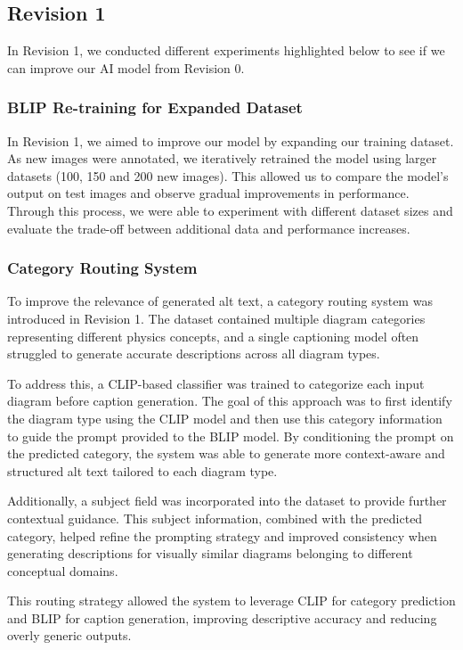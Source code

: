 \documentclass[11pt]{article}
\begin{document}
\subsection{Revision 1}
In Revision 1, we conducted different experiments highlighted below to see if we can improve our 
AI model from Revision 0.

\subsubsection{BLIP Re-training for Expanded Dataset} 
In Revision 1, we aimed to improve our model by expanding our training dataset. 
As new images were annotated, we iteratively retrained the model using larger datasets
(100, 150 and 200 new images). This allowed us to compare the model's output on 
test images and observe gradual improvements in performance. 
Through this process, we were able to experiment with different dataset sizes
and evaluate the trade-off between additional data and performance increases. 

\subsubsection{Category Routing System}

To improve the relevance of generated alt text, a category routing system was introduced in Revision 1. The dataset contained multiple diagram categories representing different physics concepts, and a single captioning model often struggled to generate accurate descriptions across all diagram types.

To address this, a CLIP-based classifier was trained to categorize each input diagram before caption generation. The goal of this approach was to first identify the diagram type using the CLIP model and then use this category information to guide the prompt provided to the BLIP model. By conditioning the prompt on the predicted category, the system was able to generate more context-aware and structured alt text tailored to each diagram type.

Additionally, a subject field was incorporated into the dataset to provide further contextual guidance. This subject information, combined with the predicted category, helped refine the prompting strategy and improved consistency when generating descriptions for visually similar diagrams belonging to different conceptual domains.

This routing strategy allowed the system to leverage CLIP for category prediction and BLIP for caption generation, improving descriptive accuracy and reducing overly generic outputs.
\end{document}
